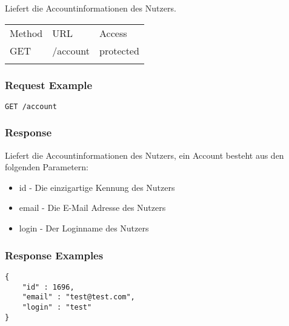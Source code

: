 Liefert die Accountinformationen des Nutzers.

\begin{longtable}[c]{@{}lll@{}}
\toprule\addlinespace
Method & URL & Access
\\\addlinespace
\midrule\endhead
GET & /account & protected
\\\addlinespace
\bottomrule
\end{longtable}

\subsubsection{Request Example}\label{request-example}

\begin{verbatim}
GET /account
\end{verbatim}

\subsubsection{Response}\label{response}

Liefert die Accountinformationen des Nutzers, ein Account besteht aus
den folgenden Parametern: 
\begin{itemize}
\item id - Die einzigartige Kennung des Nutzers
\item email - Die E-Mail Adresse des Nutzers
\item login - Der Loginname des Nutzers
\end{itemize}

\subsubsection{Response Examples}\label{response-examples}

\begin{verbatim}
{
   	"id" : 1696,
   	"email" : "test@test.com",
   	"login" : "test"
}
\end{verbatim}
